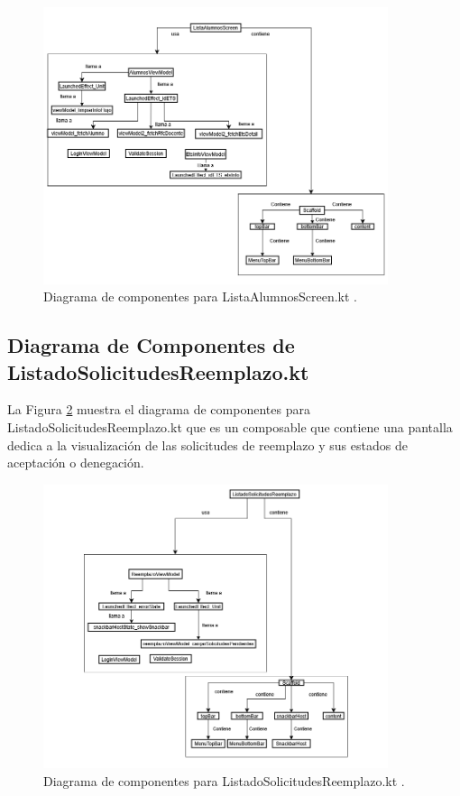 \begin{figure}[htbp!]
	\begin{center}
		\includegraphics[width=0.9\textwidth]{DiagramasMoviles/DCM (25)}
		\caption{Diagrama de componentes para ListaAlumnosScreen.kt .}
		\label{fig:Componentes_12}
	\end{center}
\end{figure}

\newpage

\subsection{Diagrama de Componentes de ListadoSolicitudesReemplazo.kt}

La Figura \ref{fig:Componentes_13} muestra el diagrama de componentes para ListadoSolicitudesReemplazo.kt que es un composable que contiene una pantalla dedica a la visualización de las solicitudes de reemplazo y sus estados de aceptación o denegación. 

\begin{figure}[htbp!]
	\begin{center}
		\includegraphics[width=0.9\textwidth]{DiagramasMoviles/DCM (26)}
		\caption{Diagrama de componentes para ListadoSolicitudesReemplazo.kt .}
		\label{fig:Componentes_13}
	\end{center}
\end{figure}

